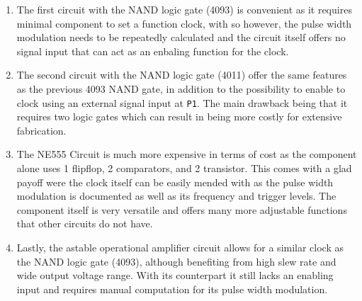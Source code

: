 \documentclass[11pt, openright]{book}
\begin{document}
\begin{enumerate}
    \item The first circuit with the NAND logic gate (4093) is convenient as it requires minimal component to set a function clock, with so however, the pulse width modulation needs to be repeatedly calculated and the circuit itself offers no signal input that can act as an enbaling function for the clock.
    \item The second circuit with the NAND logic gate (4011) offer the same features as the previous 4093 NAND gate, in addition to the possibility to enable to clock using an external signal input at \verb|P1|. The main drawback being that it requires two logic gates which can result in being more costly for extensive fabrication.
    \item The NE555 Circuit is much more expensive in terms of cost as the component alone uses 1 flipflop, 2 comparators, and 2 transistor. This comes with a glad payoff were the clock itself can be easily mended with as the pulse width modulation is documented as well as its frequency and trigger levels. The component itself is very versatile and offers many more adjustable functions that other circuits do not have.
    \item   Lastly, the astable operational amplifier circuit allows for a similar clock as the NAND logic gate (4093), although benefiting from high slew rate and wide output voltage range. With its counterpart it still lacks an enabling input and requires manual computation for its pulse width modulation.
\end{enumerate}
\end{document}
